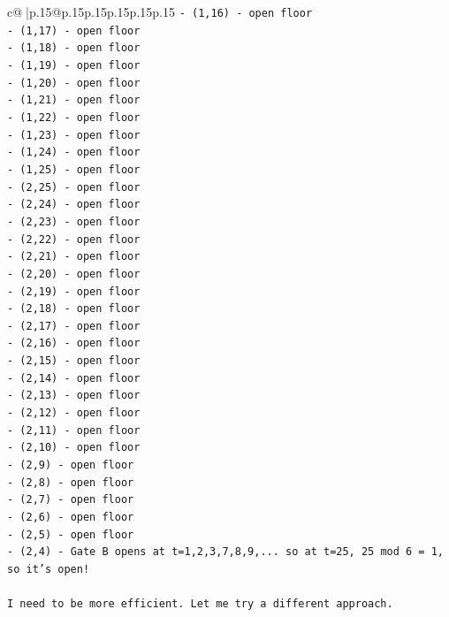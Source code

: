 \documentclass{article}
\begin{document}
{\begin{supertabular}{c@{$\;$}|p{.15\linewidth}@{}p{.15\linewidth}p{.15\linewidth}p{.15\linewidth}p{.15\linewidth}p{.15\linewidth}}
{{{\texttt{{-} (1,16) {-} open floor} \\
\texttt{{-} (1,17) {-} open floor} \\
\texttt{{-} (1,18) {-} open floor} \\
\texttt{{-} (1,19) {-} open floor} \\
\texttt{{-} (1,20) {-} open floor} \\
\texttt{{-} (1,21) {-} open floor} \\
\texttt{{-} (1,22) {-} open floor} \\
\texttt{{-} (1,23) {-} open floor} \\
\texttt{{-} (1,24) {-} open floor} \\
\texttt{{-} (1,25) {-} open floor} \\
\texttt{{-} (2,25) {-} open floor} \\
\texttt{{-} (2,24) {-} open floor} \\
\texttt{{-} (2,23) {-} open floor} \\
\texttt{{-} (2,22) {-} open floor} \\
\texttt{{-} (2,21) {-} open floor} \\
\texttt{{-} (2,20) {-} open floor} \\
\texttt{{-} (2,19) {-} open floor} \\
\texttt{{-} (2,18) {-} open floor} \\
\texttt{{-} (2,17) {-} open floor} \\
\texttt{{-} (2,16) {-} open floor} \\
\texttt{{-} (2,15) {-} open floor} \\
\texttt{{-} (2,14) {-} open floor} \\
\texttt{{-} (2,13) {-} open floor} \\
\texttt{{-} (2,12) {-} open floor} \\
\texttt{{-} (2,11) {-} open floor} \\
\texttt{{-} (2,10) {-} open floor} \\
\texttt{{-} (2,9) {-} open floor} \\
\texttt{{-} (2,8) {-} open floor} \\
\texttt{{-} (2,7) {-} open floor} \\
\texttt{{-} (2,6) {-} open floor} \\
\texttt{{-} (2,5) {-} open floor} \\
\texttt{{-} (2,4) {-} Gate B opens at t=1,2,3,7,8,9,... so at t=25, 25 mod 6 = 1, so it's open!} \\
\\ 
\texttt{I need to be more efficient. Let me try a different approach.} \\
}}}
\end{supertabular}}
\end{document}
